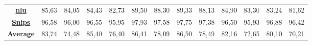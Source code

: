 \begin{table*}[htbp]
\begin{center}
\begin{tabular}{|c | c c | c c | c c | c c | c c | c c |}
        \href{https://huggingface.co/datasets/xingkunliuxtracta/nlu_evaluation_data}{\textbf{nlu}}              
            & 85,63 & 84,05     & 84,43 & 82,73     & 89,50 & 88,30     & 89,33 & 88,13     & 84,90 & 83,30     & 83,24 & 81,62 \\
        
        \href{https://huggingface.co/datasets/benayas/snips}{\textbf{Snips}}                                    
            & 96,58 & 96,00     & 96,55 & 95,95     & 97,93 & 97,58     & 97,75 & 97,38     & 96,50 & 95,93     & 96,88 & 96,42 \\
        
        \hline
        \textbf{Average}
            & 83,74 & 74,48	    & 85,40 & 76,40     & 86,41	& 78,09     & 86,50 & 78,49      & 82,16 & 72,65    & 80,10	& 70,21 \\

        \hline
        \end{tabular}

    \label{table:results_tiny}
    \end{center}
    
\end{table*}
